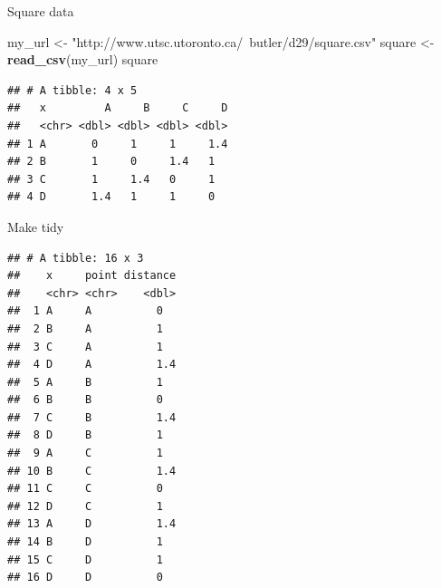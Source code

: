 \documentclass[ignorenonframetext,]{beamer}
\newenvironment{Shaded}{\begin{snugshade}}{\end{snugshade}}
\newcommand{\KeywordTok}[1]{\textcolor[rgb]{0.13,0.29,0.53}{\textbf{#1}}}
\newcommand{\NormalTok}[1]{#1}
\newcommand{\OperatorTok}[1]{\textcolor[rgb]{0.81,0.36,0.00}{\textbf{#1}}}
\newcommand{\StringTok}[1]{\textcolor[rgb]{0.31,0.60,0.02}{#1}}
\begin{document}
\begin{frame}[fragile]{Square data}
\protect\hypertarget{square-data}{}

\begin{Shaded}
\begin{Highlighting}[]
\NormalTok{my_url <-}\StringTok{ "http://www.utsc.utoronto.ca/~butler/d29/square.csv"}
\NormalTok{square <-}\StringTok{ }\KeywordTok{read_csv}\NormalTok{(my_url)}
\NormalTok{square}
\end{Highlighting}
\end{Shaded}

\begin{verbatim}
## # A tibble: 4 x 5
##   x         A     B     C     D
##   <chr> <dbl> <dbl> <dbl> <dbl>
## 1 A       0     1     1     1.4
## 2 B       1     0     1.4   1  
## 3 C       1     1.4   0     1  
## 4 D       1.4   1     1     0
\end{verbatim}

\end{frame}

\begin{frame}[fragile]{Make tidy}
\protect\hypertarget{make-tidy}{}

\scriptsize

\begin{Shaded}
\end{Shaded}

\begin{verbatim}
## # A tibble: 16 x 3
##    x     point distance
##    <chr> <chr>    <dbl>
##  1 A     A          0  
##  2 B     A          1  
##  3 C     A          1  
##  4 D     A          1.4
##  5 A     B          1  
##  6 B     B          0  
##  7 C     B          1.4
##  8 D     B          1  
##  9 A     C          1  
## 10 B     C          1.4
## 11 C     C          0  
## 12 D     C          1  
## 13 A     D          1.4
## 14 B     D          1  
## 15 C     D          1  
## 16 D     D          0
\end{verbatim}

\normalsize

\end{frame}
\end{document}
